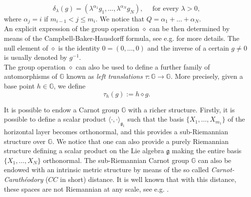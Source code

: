 \documentclass[11pt]{amsart}
\numberwithin{equation}{section} %
\theoremstyle{definition}
\begin{document}
\begin{equation}\label{eq:dilation}
	\delta_{\lambda}(g) = \left(\lambda^{\alpha_1}g_1, \ldots, \lambda^{\alpha_{N}}g_N \right), \quad \textrm{ for every } \lambda >0,
\end{equation}
\noindent where $\alpha_{j} = i$ if $m_{i-1}<j\leq m_{i}$.
We notice that $Q = \alpha_1 + \ldots + \alpha_{N}$.\\
An explicit expression of the group operation $\diamond$ can be then determined by means of the Campbell-Baker-Hausdorff formula, see e.g. \cite{BLU} for more details. The null element of $\diamond$ is the identity $0 = (0,\ldots,0)$ and the inverse of a certain $g \neq 0$ is usually denoted by $g^{-1}$.\\
The group operation $\diamond$ can also be used to define a further family of automorphisms of $\mathbb{G}$ known as {\em left translations} $\tau : \mathbb{G}\to \mathbb{G}$. More precisely, given a base point $h\in \mathbb{G}$, we define 
\begin{equation}\label{eq:left-translation}
	\tau_{h}(g):= h \diamond g.
\end{equation}

\medskip

It is possible to endow a Carnot group $\mathbb{G}$ with a richer structure. Firstly, it is possible to define a scalar product $\langle \cdot, \cdot \rangle_{\mathfrak{g}_{1}}$ such that the basis $\{X_1, \ldots, X_{m_1}\}$ of the horizontal layer becomes orthonormal, and this provides a sub-Riemannian structure over $\mathbb{G}$. We notice that one can also provide a purely Riemannian structure defining a scalar product on the Lie algebra $\mathfrak{g}$ making the entire basis $\{X_1,\ldots,X_N\}$ orthonormal.
The sub-Riemannian Carnot group $\mathbb{G}$ can also be endowed with an intrinsic metric structure by means of the so called {\em Carnot-Carath\'{e}odory} ($CC$ in short) distance. It is well known that with this distance, these spaces are not Riemannian at any scale, see e.g. \cite{Semmes}.


\medskip
\end{document}
